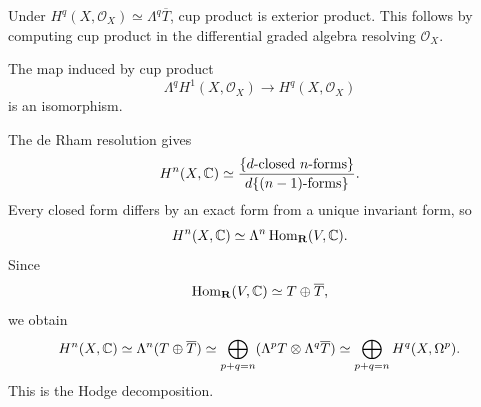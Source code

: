\begin{remark}
\label{mumford-frag-cup-product}
Under $H^q(X,\mathcal O_X)\simeq\Lambda^q\overline T$, cup product is
exterior product.  This follows by computing cup product in the differential
graded algebra resolving $\mathcal O_X$.
\end{remark}

\begin{corollary}
\label{mumford-frag-cup-cor}
The map induced by cup product
\[
 \Lambda^qH^1(X,\mathcal O_X)\longrightarrow H^q(X,\mathcal O_X)
\]
is an isomorphism.
\end{corollary}

\begin{remark}
\label{mumford-frag-hodge}
The de Rham resolution gives
\[
 H^n(X,\mathbb{C})\simeq
 \frac{\{d\text{-closed $n$-forms}\}}{d\{\text{$(n-1)$-forms}\}}.
\]
Every closed form differs by an exact form from a unique invariant form, so
\[
 H^n(X,\mathbb{C})\simeq\Lambda^n\operatorname{Hom}_{\mathbf R}(V,\mathbb{C}).
\]
Since
\[
 \operatorname{Hom}_{\mathbf R}(V,\mathbb{C})\simeq T\oplus\overline T,
\]
we obtain
\[
 H^n(X,\mathbb{C})\simeq\Lambda^n(T\oplus\overline T)
 \simeq\bigoplus_{p+q=n}(\Lambda^pT\otimes\Lambda^q\overline T)
 \simeq\bigoplus_{p+q=n}H^q(X,\Omega^p).
\]
This is the Hodge decomposition.
\end{remark}

